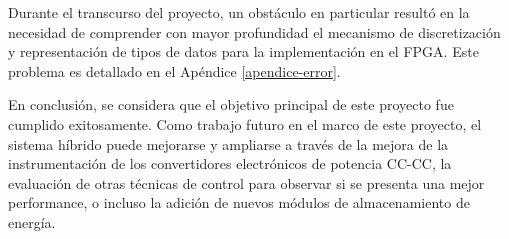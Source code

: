 Durante el transcurso del proyecto, un obstáculo en particular resultó en la necesidad de comprender con mayor profundidad el mecanismo de discretización y representación de tipos de datos para la implementación en el FPGA. Este problema es detallado en el Apéndice \ref{apendice-error}.

En conclusión, se considera que el objetivo principal de este proyecto fue cumplido exitosamente. Como trabajo futuro en el marco de este proyecto, el sistema híbrido puede mejorarse y ampliarse a través de la mejora de la instrumentación de los convertidores electrónicos de potencia CC-CC, la evaluación de otras técnicas de control para observar si se presenta una mejor performance, o incluso la adición de nuevos módulos de almacenamiento de energía.

\newpage